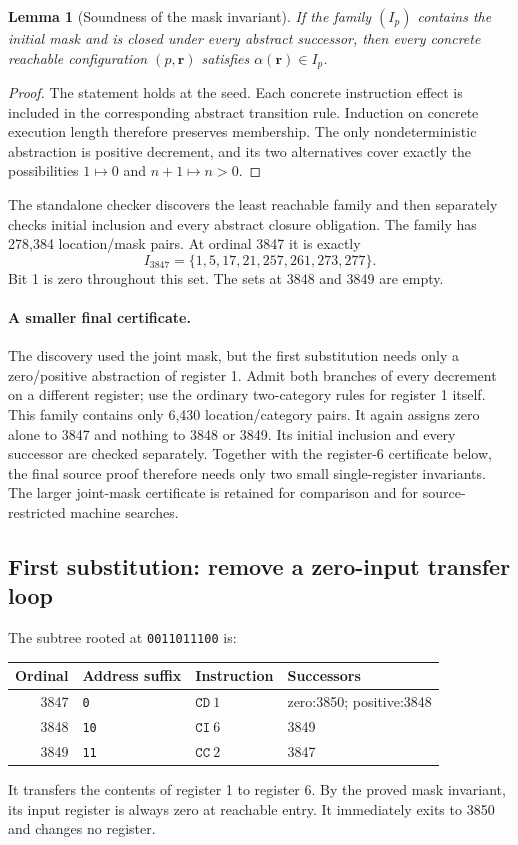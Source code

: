 \documentclass[11pt,a4paper]{article}
\newtheorem{lemma}[theorem]{Lemma}
\theoremstyle{definition}
\newcommand{\CI}{\mathtt{CI}}
\newcommand{\CD}{\mathtt{CD}}
\newcommand{\CC}{\mathtt{CC}}
\begin{document}
\begin{lemma}[Soundness of the mask invariant]
If the family $(I_p)$ contains the initial mask and is closed under every abstract successor, then every concrete reachable configuration $(p,\mathbf r)$ satisfies $\alpha(\mathbf r)\in I_p$.
\end{lemma}
\begin{proof}
The statement holds at the seed. Each concrete instruction effect is included in the corresponding abstract transition rule. Induction on concrete execution length therefore preserves membership. The only nondeterministic abstraction is positive decrement, and its two alternatives cover exactly the possibilities $1\mapsto0$ and $n+1\mapsto n>0$.
\end{proof}

The standalone checker discovers the least reachable family and then separately checks initial inclusion and every abstract closure obligation. The family has 278,384 location/mask pairs. At ordinal 3847 it is exactly
\[
I_{3847}=\{1,5,17,21,257,261,273,277\}.
\]
Bit 1 is zero throughout this set. The sets at 3848 and 3849 are empty.

\paragraph{A smaller final certificate.} The discovery used the joint mask, but the first substitution needs only a zero/positive abstraction of register 1. Admit both branches of every decrement on a different register; use the ordinary two-category rules for register 1 itself. This family contains only 6,430 location/category pairs. It again assigns zero alone to 3847 and nothing to 3848 or 3849. Its initial inclusion and every successor are checked separately. Together with the register-6 certificate below, the final source proof therefore needs only two small single-register invariants. The larger joint-mask certificate is retained for comparison and for source-restricted machine searches.

\subsection{First substitution: remove a zero-input transfer loop}

The subtree rooted at \texttt{0011011100} is:
\begin{center}
\begin{tabular}{@{}rlll@{}}
\toprule
Ordinal & Address suffix & Instruction & Successors\\
\midrule
3847 & \texttt{0} & $\CD\ 1$ & zero:3850; positive:3848\\
3848 & \texttt{10} & $\CI\ 6$ & 3849\\
3849 & \texttt{11} & $\CC\ 2$ & 3847\\
\bottomrule
\end{tabular}
\end{center}
It transfers the contents of register 1 to register 6. By the proved mask invariant, its input register is always zero at reachable entry. It immediately exits to 3850 and changes no register.
\end{document}
